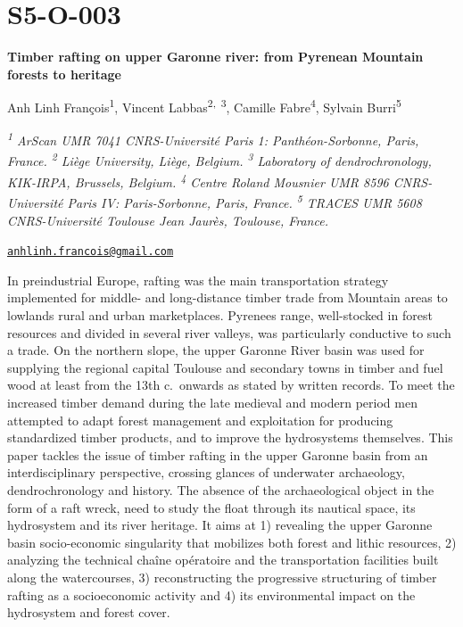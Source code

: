 \documentclass[
]{book}
\begin{document}
\hypertarget{s5-o-003}{%
\section*{S5-O-003}\label{s5-o-003}}

\textbf{Timber rafting on upper Garonne river: from Pyrenean Mountain forests to heritage}

Anh Linh François\textsuperscript{1}, Vincent Labbas\textsuperscript{2,~3}, Camille Fabre\textsuperscript{4}, Sylvain Burri\textsuperscript{5}

\emph{\textsuperscript{1} ArScan UMR 7041 CNRS-Université Paris 1: Panthéon-Sorbonne, Paris, France. \textsuperscript{2} Liège University, Liège, Belgium. \textsuperscript{3} Laboratory of dendrochronology, KIK-IRPA, Brussels, Belgium. \textsuperscript{4} Centre Roland Mousnier UMR 8596 CNRS-Université Paris IV: Paris-Sorbonne, Paris, France. \textsuperscript{5} TRACES UMR 5608 CNRS-Université Toulouse Jean Jaurès, Toulouse, France.}

\href{mailto:anhlinh.francois@gmail.com}{\nolinkurl{anhlinh.francois@gmail.com}}

In preindustrial Europe, rafting was the main transportation strategy implemented for middle- and long-distance timber trade from Mountain areas to lowlands rural and urban marketplaces. Pyrenees range, well-stocked in forest resources and divided in several river valleys, was particularly conductive to such a trade. On the northern slope, the upper Garonne River basin was used for supplying the regional capital Toulouse and secondary towns in timber and fuel wood at least from the 13th c.~onwards as stated by written records. To meet the increased timber demand during the late medieval and modern period men attempted to adapt forest management and exploitation for producing standardized timber products, and to improve the hydrosystems themselves. This paper tackles the issue of timber rafting in the upper Garonne basin from an interdisciplinary perspective, crossing glances of underwater archaeology, dendrochronology and history. The absence of the archaeological object in the form of a raft wreck, need to study the float through its nautical space, its hydrosystem and its river heritage. It aims at 1) revealing the upper Garonne basin socio-economic singularity that mobilizes both forest and lithic resources, 2) analyzing the technical chaîne opératoire and the transportation facilities built along the watercourses, 3) reconstructing the progressive structuring of timber rafting as a socioeconomic activity and 4) its environmental impact on the hydrosystem and forest cover.
\end{document}

